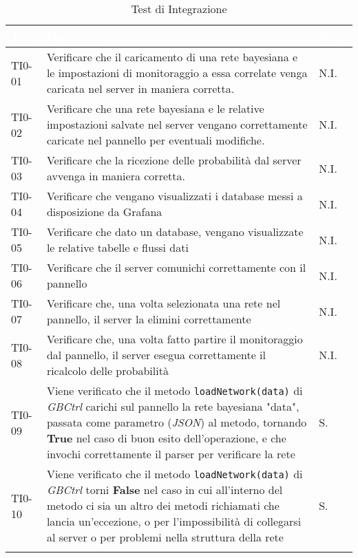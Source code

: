 \begin{longtable}{|C{.15\textwidth}|m{.52\textwidth}|m{.08\textwidth}|}
\hline
{}\textbf{\textcolor{white}{Test}} & \textbf{\textcolor{white}{Descrizione}} & \textbf{\textcolor{white}{Esito}}\\
\hline \hline
\endhead

TI0-01 & Verificare che il caricamento di una rete bayesiana e le impostazioni di monitoraggio a essa correlate venga caricata nel server in maniera corretta. & N.I. \\
\hline
{} TI0-02 & Verificare che una rete bayesiana e le relative impostazioni salvate nel server vengano correttamente caricate nel pannello per eventuali modifiche. & N.I. \\
\hline
TI0-03 & Verificare che la ricezione delle probabilità dal server avvenga in maniera corretta. & N.I. \\
\hline
{} TI0-04 & Verificare che vengano visualizzati i database messi a disposizione da Grafana & N.I. \\
\hline
TI0-05 & Verificare che dato un database, vengano visualizzate le relative tabelle e flussi dati & N.I. \\
\hline
{}TI0-06 & Verificare che il server comunichi correttamente con il pannello & N.I. \\
\hline
TI0-07 & Verificare che, una volta selezionata una rete nel pannello, il server la elimini correttamente & N.I. \\
\hline 
{}TI0-08 & Verificare che, una volta fatto partire il monitoraggio dal pannello, il server esegua correttamente il ricalcolo delle probabilità & N.I. \\  
\hline
TI0-09 & Viene verificato che il metodo \texttt{loadNetwork(data)} di \textit{GBCtrl} carichi sul pannello la rete bayesiana "data", passata come parametro (\textit{JSON}) al metodo, tornando \textbf{True} nel caso di buon esito dell'operazione, e che invochi correttamente il parser per verificare la rete & S.\\
\hline
{}TI0-10 & Viene verificato che il metodo \texttt{loadNetwork(data)} di \textit{GBCtrl} torni \textbf{False} nel caso in cui all'interno del metodo ci sia un altro dei metodi richiamati che lancia un'eccezione, o per l'impossibilità di collegarsi al server o per problemi nella struttura della rete  & S.\\
\hline
	
\caption{Test di Integrazione}
\label{testintegrazione}
\end{longtable}